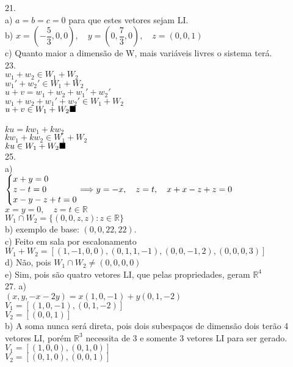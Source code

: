 \documentclass[12pt]{article}
\begin{document}
21.\\
a) $a=b=c=0$ para que estes vetores sejam LI.\\
b) $x=(-\dfrac{5}{3},0,0),\quad y=(0,\dfrac{7}{3},0),\quad z=(0,0,1)$\\
c) Quanto maior a dimensão de W, mais variáveis livres o sistema terá.\\

23.\\
$w_{1}+w_{2}\in W_{1}+W_{2}$\\
$w_{1}'+w_{2}'\in W_{1}+W_{2}$\\
$u+v = w_{1}+w_{2}+w_{1}'+w_{2}'$\\
$w_{1}+w_{2}+w_{1}'+w_{2}'\in W_{1}+W_{2}$\\
$u+v\in W_{1}+W_{2}\hfill\blacksquare$\\\\
$ku=kw_{1}+kw_{2}$\\
$kw_{1}+kw_{2}\in W_{1}+W_{2}$\\
$ku\in W_{1}+W_{2}\hfill\blacksquare$\\

25.\\
a)\\
$\left\{\begin{array}{@{}l@{}}
	x+y=0\\
	z-t=0\\
	x-y-z+t=0
\end{array}\right. \Longrightarrow y = -x,\quad z=t,\quad x+x-z+z=0$\\
$x=y=0,\quad z=t \in \mathds{R}$\\
$W_{1}\cap W_{2} = \lbrace(0,0,z,z): z \in \mathds{R} \rbrace$\\
b) exemplo de base: $(0,0,22,22)$.\\
c) Feito em sala por escalonamento\\
$W_{1}+ W_{2} = [(1,-1,0,0),(0,1,1,-1),(0,0,-1,2),(0,0,0,3)]$\\
d) Não, pois $W_{1}\cap W_{2} \neq (0,0,0,0)$\\
e) Sim, pois são quatro vetores LI, que pelas propriedades, geram $\mathds{R}^{4}$\\

27. a)\\
$(x,y,-x-2y) = x(1,0,-1) + y(0,1,-2)$\\
$V_{1} = [(1,0,-1),(0,1,-2)]$\\
$V_{2} = [(0,0,1)]$\\
b) A soma nunca será direta, pois dois subespaços de dimensão dois terão 4 vetores LI, porém $\mathds{R}^{3}$ necessita de 3 e somente 3 vetores LI para ser gerado.\\
$V_{1} = [(1,0,0),(0,1,0)]$\\
$V_{2} = [(0,1,0),(0,0,1)]$\\
\end{document}
